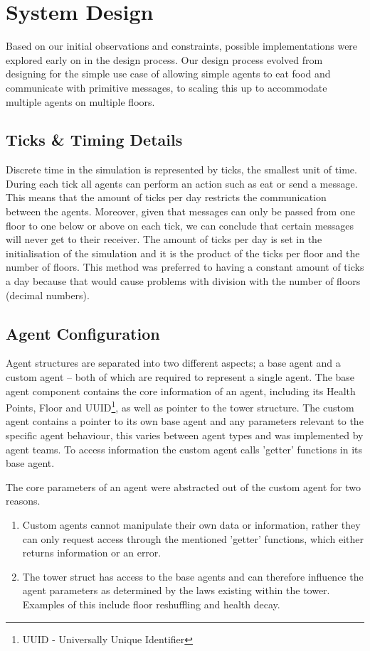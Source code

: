 \section{System Design}\label{system_design}

Based on our initial observations and constraints, possible implementations were explored early on in the design process. Our design process evolved from designing for the simple use case of allowing simple agents to eat food and communicate with primitive messages, to scaling this up to accommodate multiple agents on multiple floors.

\subsection{Ticks \& Timing Details}

Discrete time in the simulation is represented by ticks, the smallest unit of time. During each tick all agents can perform an action such as eat or send a message. This means that the amount of ticks per day restricts the communication between the agents. Moreover, given that messages can only be passed from one floor to one below or above on each tick, we can conclude that certain messages will never get to their receiver. The amount of ticks per day is set in the initialisation of the simulation and it is the product of the ticks per floor and the number of floors. This method was preferred to having a constant amount of ticks a day because that would cause problems with division with the number of floors (decimal numbers).

\subsection{Agent Configuration}

Agent structures are separated into two different aspects; a base agent and a custom agent – both of which are required to represent a single agent.
The base agent component contains the core information of an agent, including its Health Points, Floor and UUID\footnote{UUID - Universally Unique Identifier}, as well as pointer to the tower structure. 
The custom agent contains a pointer to its own base agent and any parameters relevant to the specific agent behaviour, this varies between agent types and was implemented by agent teams. To access information the custom agent calls 'getter' functions in its base agent.

The core parameters of an agent were abstracted out of the custom agent for two reasons.
\begin{enumerate}
    \item Custom agents cannot manipulate their own data or information, rather they can only request access through the mentioned 'getter' functions, which either returns information or an error.
    \item The tower struct has access to the base agents and can therefore influence the agent parameters as determined by the laws existing within the tower. Examples of this include floor reshuffling and health decay.
\end{enumerate}

